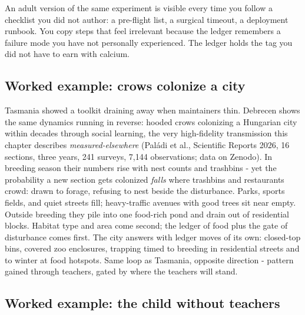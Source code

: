 An adult version of the same experiment is visible every time you follow a checklist you did not author: a pre-flight list, a surgical timeout, a deployment runbook. You copy steps that feel irrelevant because the ledger remembers a failure mode you have not personally experienced. The ledger holds the tag you did not have to earn with calcium.

\subsection*{Worked example: crows colonize a city}

Tasmania showed a toolkit draining away when maintainers thin. Debrecen shows the same dynamics running in reverse: hooded crows colonizing a Hungarian city within decades through social learning, the very high-fidelity transmission this chapter describes \textit{measured-elsewhere} (Pal\'adi et al., Scientific Reports 2026, 16 sections, three years, 241 surveys, 7,144 observations; data on Zenodo). In breeding season their numbers rise with nest counts and trashbins - yet the probability a new section gets colonized \textit{falls} where trashbins and restaurants crowd: drawn to forage, refusing to nest beside the disturbance. Parks, sports fields, and quiet streets fill; heavy-traffic avenues with good trees sit near empty. Outside breeding they pile into one food-rich pond and drain out of residential blocks. Habitat type and area come second; the ledger of food plus the gate of disturbance comes first. The city answers with ledger moves of its own: closed-top bins, covered zoo enclosures, trapping timed to breeding in residential streets and to winter at food hotspots. Same loop as Tasmania, opposite direction - pattern gained through teachers, gated by where the teachers will stand.

\subsection*{Worked example: the child without teachers}

